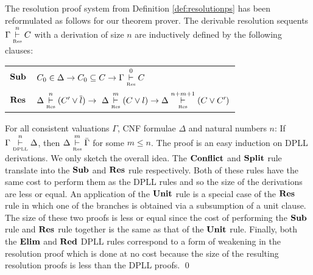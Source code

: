 \medskip
\begin{myremark}
  The resolution proof system from Definition \ref{def:resolutionps}
  has been reformulated as follows for our theorem prover. The
  derivable resolution sequents $\Gamma \overset{n}{\underset{\text{\tiny Res}}{\vdash}} C$ with a
  derivation of size $n$ are inductively defined by the following
  clauses:
\begin{center}
\begin{tabular}{ll}
$\mathbf{Sub}$ &
$C_0 \in \Delta \to C_0 \subseteq C \to \Gamma \overset{0}{\underset{\text{\tiny Res}}{\vdash}} C$
\\
$\mathbf{Res}$ &
$\Delta \overset{n}{\underset{\text{\tiny Res}}{\vdash}} (C' \vee \overline{l}) 
\to  \ \Delta \overset{m}{\underset{\text{\tiny Res}}{\vdash}} (C \vee l)  \to \Delta \overset{n + m + 1}{\underset{\text{\tiny Res}}{\vdash}} (C \vee C')$
\end{tabular}
\end{center}
%
\label{def:resolution}
\end{myremark}
\medskip



\begin{mytheorem} 
\label{thm:dpllresolution}
%
For all consistent valuations $\Gamma$, CNF formulae $\Delta$ and natural numbers $n$: If $\Gamma \overset{n}{\underset{\text{\tiny DPLL}}{\vdash}} \Delta$, then $\Delta \overset{m}{\underset{\text{\tiny Res}}{\vdash}} \bar{\Gamma}$
for some $m\le n$.
%
%
\proof
The proof is an easy induction on DPLL derivations. 
We only sketch the overall idea. 
The $\mathbf{Conflict}$ and $\mathbf{Split}$ rule translate into
the $\mathbf{Sub}$ and $\mathbf{Res}$ rule respectively.
Both of these rules have the same cost to perform them as the DPLL rules and so the size of the derivations are less or equal. 
An application of the $\mathbf{Unit}$ rule is a special case of the $\mathbf{Res}$ rule in which one of the branches is obtained via a subsumption of a unit clause. The size of these two proofs is less or equal since the cost of performing the $\mathbf{Sub}$ rule and $\mathbf{Res}$ rule together is the same as that of the $\mathbf{Unit}$ rule. Finally, both the $\mathbf{Elim}$ and $\mathbf{Red}$ DPLL rules correspond to a form of weakening in the resolution proof which is done at no cost because the size of the resulting resolution proofs is less than the DPLL proofs. 
\qed

\end{mytheorem}
\medskip

